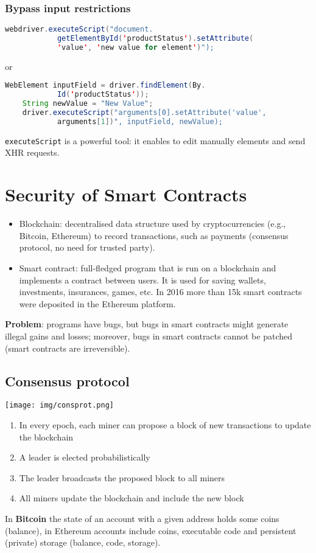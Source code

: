 \documentclass[a4paper, 10pt, titlepage]{article}
\begin{document}
\subsubsection*{Bypass input restrictions}
\begin{lstlisting}[language=java]
	webdriver.executeScript("document.
			getElementById('productStatus').setAttribute(
			'value', 'new value for element')");
\end{lstlisting}
or 
\begin{lstlisting}[language=java]
	WebElement inputField = driver.findElement(By.
			Id('productStatus'));
	String newValue = "New Value";
	driver.executeScript("arguments[0].setAttribute('value',
			arguments[1])", inputField, newValue);
\end{lstlisting}
\lstinline|executeScript| is a powerful tool: it enables to edit manually elements and send XHR requests.

\newpage
\section{Security of Smart Contracts}
\begin{itemize}
\item Blockchain: decentralised data structure used by cryptocurrencies (e.g., Bitcoin, Ethereum) to record transactions, such as payments (consensus protocol, no need for trusted party).
\item Smart contract: full-fledged program that is run on a blockchain and implements a contract between users. It is used for saving wallets, investments, insurances, games, etc. In 2016 more than 15k smart contracts were deposited in the Ethereum platform.
\end{itemize}
\textbf{Problem}: programs have bugs, but bugs in smart contracts might generate illegal gains and losses; moreover, bugs in smart contracts cannot be patched (smart contracts are irreversible).

\subsection{Consensus protocol}
\begin{center}
\texttt{[image: img/consprot.png]}
\end{center}
\begin{enumerate}
\item In every epoch, each miner can propose a block of new transactions to update the blockchain
\item A leader is elected probabilistically
\item The leader broadcasts the proposed block to all miners
\item All miners update the blockchain and include the new block
\end{enumerate}
In \textbf{Bitcoin} the state of an account with a given address holds some coins (balance), in Ethereum accounts include coins, executable code and persistent (private) storage (balance, code, storage).
\end{document}

